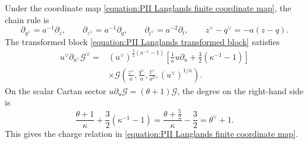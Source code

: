 \documentclass[a4paper,11pt]{article}
\numberwithin{equation}{section}
\begin{document}
Under the coordinate map
\eqref{equation:PII Langlands finite coordinate map}, the chain rule is
\begin{equation}
	\partial_{q^{\vee}}=a^{-1}\partial_{z},\qquad
	\partial_{z^{\vee}}=a^{-1}\partial_{q},\qquad
	\partial_{t^{\vee}}=a^{-2}\partial_{t},\qquad
	z^{\vee}-q^{\vee}=-a(z-q).
\end{equation}
The transformed block
\eqref{equation:PII Langlands transformed block} satisfies
\begin{equation}
	\begin{aligned}
		u^{\vee}\partial_{u^{\vee}}\mathcal{G}^{\vee}
		={}&(u^{\vee})^{\frac{3}{2}(\kappa^{-1}-1)}
		\left[\frac{1}{\kappa}u\partial_{u}
		+\frac{3}{2}(\kappa^{-1}-1)\right]\\
		&\times\mathcal{G}\!\left(
		\frac{z^{\vee}}{a},\frac{q^{\vee}}{a},
		\frac{t^{\vee}}{a^{2}},(u^{\vee})^{1/\kappa}\right).
	\end{aligned}
\end{equation}
On the scalar Cartan sector
$u\partial_{u}\mathcal{G}=(\theta+1)\mathcal{G}$, the degree on the
right-hand side is
\begin{equation}
	\frac{\theta+1}{\kappa}
	+\frac{3}{2}(\kappa^{-1}-1)
	=\frac{\theta+\frac{5}{2}}{\kappa}-\frac{3}{2}
	=\theta^{\vee}+1.
\end{equation}
This gives the charge relation in
\eqref{equation:PII Langlands finite coordinate map}.
\end{document}
